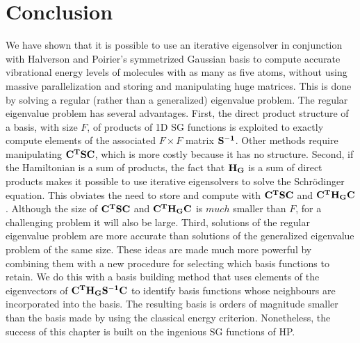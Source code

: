 %

\section{Conclusion}

We have shown that it is possible to use an iterative eigensolver in conjunction with Halverson and Poirier's symmetrized Gaussian basis to compute 
accurate vibrational energy levels of molecules with as many as five atoms, without using massive parallelization and storing and manipulating huge matrices.  This 
is done by solving a regular (rather than a generalized) eigenvalue problem.  The regular eigenvalue problem has several advantages.  First, 
the direct product structure of  a basis, with  size $F$,   of products of 1D SG functions is exploited to exactly compute elements of the  associated 
 $F \times F$ matrix  ${\bf{S^{-1}}}$.  Other methods require manipulating    ${\bf{  C^T S  C}}$, which is more costly because it has no structure.\cite{Shimshovitz2014,Halverson2012,Halverson2015,Machnes2016}  
%
Second, if the Hamiltonian is a sum of products, the fact that
%
  ${\bf{ H_G  }}$ is a sum of direct products makes it possible to use iterative eigensolvers to solve the 
Schr\"{o}dinger equation.   This obviates the need to store and compute with  ${\bf{ C^T S C}}$ and ${\bf{ C^T H_G C}}$.   Although the size of 
 ${\bf{ C^T S C}}$ and ${\bf{ C^T H_G C}}$  is  $much$ smaller than $F$, for a challenging problem it will also be large.   
%
Third,  solutions of the regular eigenvalue problem are more accurate than solutions of the generalized eigenvalue problem of the same size.    
These ideas are made much more powerful by combining them with a new procedure for selecting which basis functions to  retain.   We do this with a 
 basis building  method that uses elements of the eigenvectors of  ${\bf{ C^T H_G S^{-1}    C}}$ to identify basis functions whose neighbours are incorporated into the basis.  The resulting 
basis is orders of magnitude smaller than the basis made by using the 
 classical 
energy criterion.  Nonetheless, the success of this chapter is built on the ingenious SG functions of HP.  






